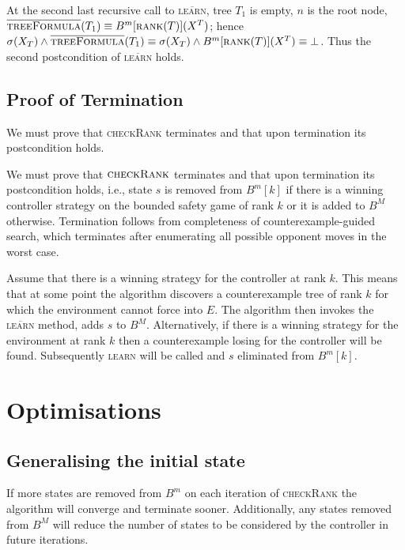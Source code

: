 \documentclass{llncs}
\newcommand{\textoverline}[1]{$\overline{\mbox{#1}}$}
\begin{document}
At the second last recursive call to \textsc{\textoverline{learn}}, tree $T_1$
is empty, $n$ is the root node, $\textsc{\textoverline{treeFormula}}(T_1)
\equiv B^m[\textsc{rank}(T)](X^T)$; hence $\sigma(X_T) \land
\textsc{\textoverline{treeFormula}}(T_1) \equiv \sigma(X_T) \land
B^m[\textsc{rank}(T)](X^T) \equiv \bot$.  Thus the second postcondition of
\textsc{\textoverline{learn}} holds.

\subsection{Proof of Termination}

We must prove that \textsc{checkRank} terminates and that upon termination its
postcondition holds.

We must prove that $\textsc{checkRank}$ terminates and that upon termination
its postcondition holds, i.e., state $s$ is removed from $B^m[k]$ if there is a
winning controller strategy on the bounded safety game of rank $k$ or it is
added to $B^M$ otherwise. Termination follows from completeness of
counterexample-guided search, which terminates after enumerating all possible
opponent moves in the worst case.

Assume that there is a winning strategy for the controller at rank $k$. This
means that at some point the algorithm discovers a counterexample tree of rank
$k$ for which the environment cannot force into $E$. The algorithm then invokes
the \textsc{\textoverline{learn}} method, adds $s$ to $B^M$.  Alternatively, if
there is a winning strategy for the environment at rank $k$ then a
counterexample losing for the controller will be found. Subsequently
\textsc{learn} will be called and $s$ eliminated from $B^m[k]$.

\section{Optimisations}


\subsection{Generalising the initial state}

If more states are removed from $B^m$ on each iteration of \textsc{checkRank}
the algorithm will converge and terminate sooner. Additionally, any states
removed from $B^M$ will reduce the number of states to be considered by the
controller in future iterations.
\end{document}
